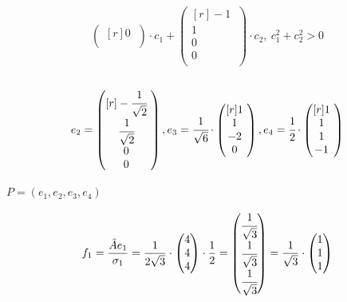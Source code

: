 \documentclass[12pt]{article}
\theoremstyle{definition}
\numberwithin{equation}{section}
\begin{document}
\begin{enumerate}
\[\begin{pmatrix}[r]
		0~\\
		\end{pmatrix} \cdot c_1 + \begin{pmatrix}[r]
		-1~\\         
		1~\\
		0~\\
		0~\\
		\end{pmatrix}\cdot c_2,~ c_1^2+c_2^2>0\]
		\\
		\[e_2 = \begin{pmatrix}[r]
		-\cfrac{1}{\sqrt{2}}~\\         
		\cfrac{1}{\sqrt{2}}~\\
		0~\\
		0~\\
		\end{pmatrix}, e_3 = \cfrac{1}{\sqrt{6}} \cdot \begin{pmatrix}[r]
		1~\\         
		1~\\
		-2~\\
		0~\\
		\end{pmatrix}, e_4 = \cfrac{1}{2} \cdot \begin{pmatrix}[r]
		1~\\         
		1~\\
		1~\\
		-1~\\
		\end{pmatrix}\]
	\end{enumerate}
	\begin{center} $P=(e_1, e_2, e_3, e_4)$ \end{center}
	\[f_1=\frac{\tilde{A}e_1}{\sigma_1}=\frac{1}{2\sqrt{3}} \cdot \begin{pmatrix}
	4\\         
	4\\
	4\\
	\end{pmatrix} \cdot \frac{1}{2} = \begin{pmatrix}
	\cfrac{1}{\sqrt{3}}\\         
	\cfrac{1}{\sqrt{3}}\\
	\cfrac{1}{\sqrt{3}}\\
	\end{pmatrix} = \frac{1}{\sqrt{3}} \cdot \begin{pmatrix}
	1\\         
	1\\
	1\\
	\end{pmatrix}\]
\end{document}
